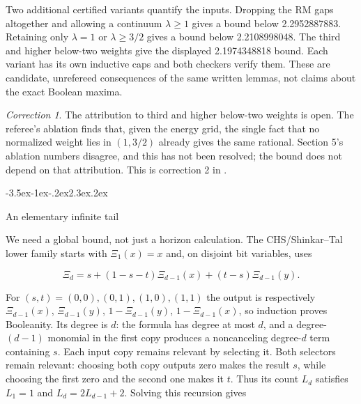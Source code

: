 \documentclass[11pt]{article}
\makeatletter
\renewcommand\section{\@startsection{section}{1}{\z@}
  {-3.5ex\@plus -1ex\@minus -.2ex}{2.3ex\@plus .2ex}
  {\normalfont\Large\bfseries\raggedright}}
\theoremstyle{remark}
\theoremstyle{correctionstyle}
\newtheorem*{correction}{Correction}
\makeatother
\begin{document}
\leavevmode\label{src-p068}Two additional certified variants quantify the inputs. Dropping the RM
gaps altogether and allowing a continuum $\lambda\ge1$ gives a bound below
2.2952887883. Retaining only $\lambda=1$ or $\lambda\ge3/2$ gives a bound below
2.2108998048. The third and higher below-two weights give the displayed
2.1974348818 bound. Each variant has its own inductive caps and both
checkers verify them. These are candidate, unrefereed consequences of the
same written lemmas, not claims about the exact Boolean maxima.\label{src-end-p068}\par

\begin{correction}\label{correction-5}
The attribution to third and higher below-two weights is open. The referee's
ablation finds that, given the energy grid, the single fact that no normalized
weight lies in $(1,3/2)$ already gives the same rational. Section 5's ablation
numbers disagree, and this has not been resolved; the bound does not depend
on that attribution. This is correction 2 in .
\end{correction}
\section{An elementary infinite tail}\label{src-p069}\label{src-end-p069}

\leavevmode\label{src-p070}We need a global bound, not just a horizon calculation. The CHS/Shinkar–Tal
lower family starts with $\Xi_1(x)=x$ and, on disjoint bit variables, uses\label{src-end-p070}\par

\begin{equation}
\Xi_d=s+(1-s-t)\Xi_{d-1}(x)+(t-s)\Xi_{d-1}(y).\tag*{}
\label{src-p071}
\end{equation}

\leavevmode\label{src-p072}For $(s,t)=(0,0),(0,1),(1,0),(1,1)$ the output is respectively
$\Xi_{d-1}(x)$, $\Xi_{d-1}(y)$, $1-\Xi_{d-1}(y)$, $1-\Xi_{d-1}(x)$,
so induction proves Booleanity. Its degree is $d$: the formula has degree
at most $d$, and a degree-$(d-1)$ monomial in the first copy produces a
noncanceling degree-$d$ term containing $s$. Each input copy remains relevant
by selecting it. Both selectors remain relevant: choosing both copy outputs
zero makes the result $s$, while choosing the first zero and the second one
makes it $t$. Thus its count $L_d$ satisfies
$L_1=1$ and $L_d=2L_{d-1}+2$. Solving this recursion gives\label{src-end-p072}\par
\end{document}
